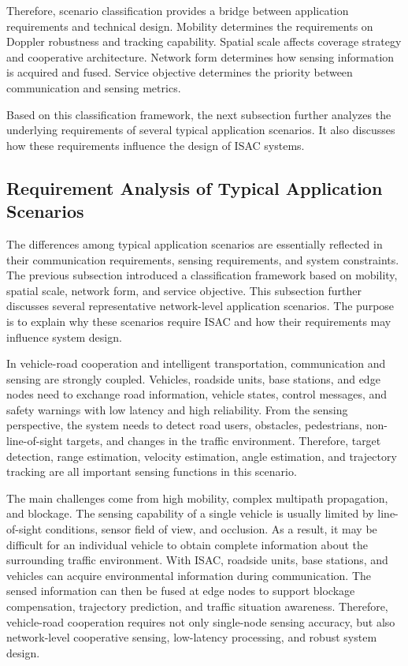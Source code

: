 Therefore, scenario classification provides a bridge between application requirements and technical design.
Mobility determines the requirements on Doppler robustness and tracking capability.
Spatial scale affects coverage strategy and cooperative architecture.
Network form determines how sensing information is acquired and fused.
Service objective determines the priority between communication and sensing metrics.

Based on this classification framework, the next subsection further analyzes the underlying requirements of several typical application scenarios.
It also discusses how these requirements influence the design of ISAC systems.

\subsection{Requirement Analysis of Typical Application Scenarios}

The differences among typical application scenarios are essentially reflected in their communication requirements, sensing requirements, and system constraints.
The previous subsection introduced a classification framework based on mobility, spatial scale, network form, and service objective.
This subsection further discusses several representative network-level application scenarios.
The purpose is to explain why these scenarios require ISAC and how their requirements may influence system design.


In vehicle-road cooperation and intelligent transportation, communication and sensing are strongly coupled.
Vehicles, roadside units, base stations, and edge nodes need to exchange road information, vehicle states, control messages, and safety warnings with low latency and high reliability.
From the sensing perspective, the system needs to detect road users, obstacles, pedestrians, non-line-of-sight targets, and changes in the traffic environment.
Therefore, target detection, range estimation, velocity estimation, angle estimation, and trajectory tracking are all important sensing functions in this scenario.

The main challenges come from high mobility, complex multipath propagation, and blockage.
The sensing capability of a single vehicle is usually limited by line-of-sight conditions, sensor field of view, and occlusion.
As a result, it may be difficult for an individual vehicle to obtain complete information about the surrounding traffic environment.
With ISAC, roadside units, base stations, and vehicles can acquire environmental information during communication.
The sensed information can then be fused at edge nodes to support blockage compensation, trajectory prediction, and traffic situation awareness.
Therefore, vehicle-road cooperation requires not only single-node sensing accuracy, but also network-level cooperative sensing, low-latency processing, and robust system design.

